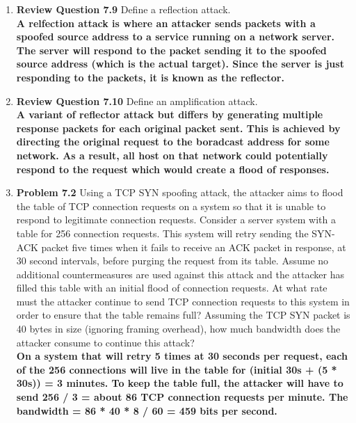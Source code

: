 \documentclass[12pt]{article}
\begin{document}
\renewcommand{\headrulewidth}{0.4pt}
\vspace{-3mm}
\begin{enumerate}
\item \textbf{Review Question 7.9} Define a reflection attack. \\

\textbf{A relfection attack is where an attacker sends packets with a spoofed source address to a service running on a network server. The server will respond to the packet sending it to the spoofed source address (which is the actual target). Since the server is just responding to the packets, it is known as the reflector.} \\

\item \textbf{Review Question 7.10} Define an amplification attack. \\

\textbf{A variant of reflector attack but differs by generating multiple response packets for each original packet sent. This is achieved by directing the original request to the boradcast address for some network. As a result, all host on that network could potentially respond to the request which would create a flood of responses.} \\

\item \textbf{Problem 7.2} Using a TCP SYN spoofing attack, the attacker aims to flood the table of TCP connection requests on a system so that it is unable to respond to legitimate connection requests. Consider a server system with a table for 256 connection requests. This system will retry sending the SYN-ACK packet five times when it fails to receive an ACK packet in response, at 30 second intervals, before purging the request from its table. Assume no additional countermeasures are used against this attack and the attacker has filled this table with an initial flood of connection requests. At what rate must the attacker continue to send TCP connection requests to this system in order to ensure that the table remains full? Assuming the TCP SYN packet is 40 bytes in size (ignoring framing overhead), how much bandwidth does the attacker consume to continue this attack? \\

\textbf{On a system that will retry 5 times at 30 seconds per request, each of the 256 connections will live in the table for (initial 30s + (5 * 30s)) = 3 minutes. To keep the table full, the attacker will have to send 256 / 3 = about 86 TCP connection requests per minute. The bandwidth = 86 * 40 * 8 / 60 = 459 bits per second. } \\


\end{enumerate}
\end{document}

